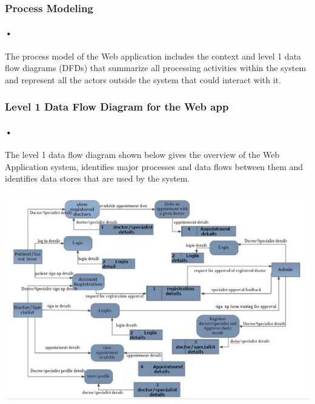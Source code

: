 \documentclass[12pt]{article}
\begin{document}
\subsubsection{Process Modeling}
\paragraph{•}The process model of the Web application includes the context and level 1 data flow diagrams (DFDs) that summarize all processing activities within the system and represent all the actors outside the system that could interact with it.

\subsubsection{Level 1 Data Flow Diagram for the Web app}
\paragraph{•}The level 1 data flow diagram shown below gives the overview of the Web Application system, identifies major processes and data flows between them and identifies data stores that are used by the system.

\begin{center}
\includegraphics[scale=1.2]{dfd}
\end{center}
\end{document}
